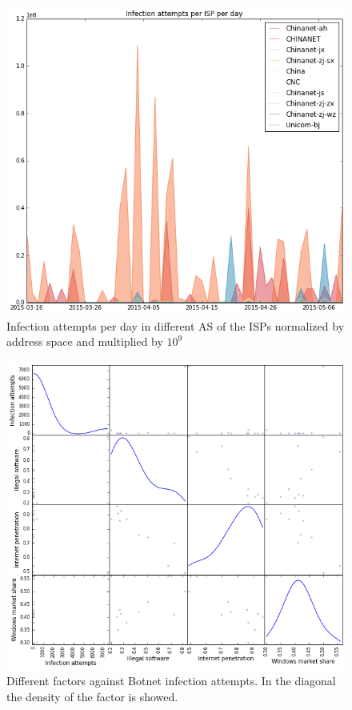 \begin{figure}[h]
     \caption{Infection attempts per day in different AS of the ISPs normalized by address space and multiplied by $10^9$}
     \label{fig:isp_legend_area}
    \centering
    \includegraphics[width=\linewidth]{images/isp_legend_area_norm}
\end{figure}
\begin{figure}[h]
     \caption{Different factors against Botnet infection attempts. In the diagonal the density of the factor is showed.}
     \label{fig:corr2}
    \centering
    \includegraphics[width=\linewidth]{images/corr_2}
\end{figure}
